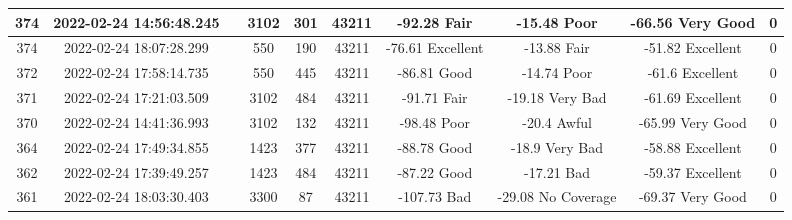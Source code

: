 \begin{longtable*}{|c|c|c|c|c|c|c|c|c|c|}
374&2022-02-24 14:56:48.245&&3102&301&43211& -92.28    Fair        & -15.48    Poor        & -66.56    Very Good   & 0\\\hline
{}374&2022-02-24 18:07:28.299&&550&190&43211& -76.61    Excellent   & -13.88    Fair        & -51.82    Excellent   & 0\\\hline
{}372&2022-02-24 17:58:14.735&&550&445&43211& -86.81    Good        & -14.74    Poor        & -61.6     Excellent   & 0\\\hline
{}371&2022-02-24 17:21:03.509&&3102&484&43211& -91.71    Fair        & -19.18    Very Bad    & -61.69    Excellent   & 0\\\hline
{}370&2022-02-24 14:41:36.993&&3102&132&43211& -98.48    Poor        & -20.4     Awful       & -65.99    Very Good   & 0\\\hline
{}364&2022-02-24 17:49:34.855&&1423&377&43211& -88.78    Good        & -18.9     Very Bad    & -58.88    Excellent   & 0\\\hline
{}362&2022-02-24 17:39:49.257&&1423&484&43211& -87.22    Good        & -17.21    Bad         & -59.37    Excellent   & 0\\\hline
{}361&2022-02-24 18:03:30.403&&3300&87&43211& -107.73   Bad         & -29.08    No Coverage & -69.37    Very Good   & 0\\\hline

\end{longtable*}
